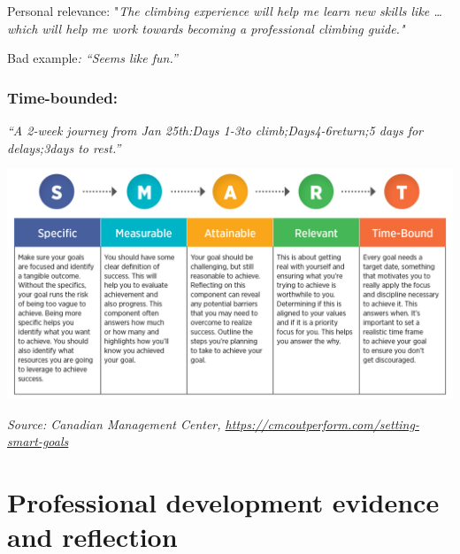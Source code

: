 \documentclass[
  openany]{book}
\begin{document}
Personal relevance: "\emph{The climbing experience will help me learn new skills like \ldots{} which will help me work towards becoming a professional climbing guide."}

Bad example\emph{: ``Seems like fun.''}

\hypertarget{time-bounded}{%
\subsubsection{Time-bounded:}\label{time-bounded}}

\emph{``A 2-week journey from Jan 25th:Days 1-3to climb;Days4-6return;5 days for delays;3days to rest.''}

\begin{center}\includegraphics[width=1\linewidth]{images/assessments/SMART} \end{center}

\emph{Source: Canadian Management Center, \url{https://cmcoutperform.com/setting-smart-goals}}

\hypertarget{professional-development-evidence-and-reflection}{%
\section{Professional development evidence and reflection}\label{professional-development-evidence-and-reflection}}
\end{document}
